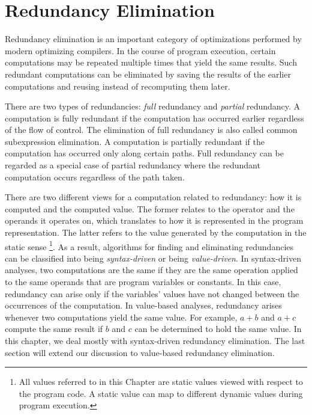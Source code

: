 \chapter{Redundancy Elimination}
\label{chapter:pre_not_helped}

\label{section:Part3:Pre_not_helped:Intro}

Redundancy elimination is an important category of optimizations performed by modern optimizing compilers. 
In the course of program execution, certain computations may be repeated multiple times that yield the same results. 
Such redundant computations can be eliminated by saving the results of the earlier computations and reusing instead of recomputing them later.

There are two types of redundancies: 
\emph{full} redundancy and \emph{partial} redundancy. 
A computation is fully redundant if the computation has occurred earlier regardless of the flow of control. 
The elimination of full redundancy is also called common subexpression elimination. 
A computation is partially redundant if the computation has occurred only along certain paths. 
Full redundancy can be regarded as a special case of partial redundancy where the redundant computation occurs regardless of the path taken.

There are two different views for a computation related to redundancy: 
how it is computed and the computed value. 
The former relates to the operator and the operands it operates on, which translates to how it is represented in the program representation. 
The latter refers to the value generated by the computation in the static sense
\footnote{All values referred to in this Chapter are static values viewed with respect to the program code. 
  A static value can map to different dynamic values during program execution.}. 
As a result, algorithms for finding and eliminating redundancies can be classified into being \emph{syntax-driven} or being \emph{value-driven}. 
In syntax-driven analyses, two computations are the same if they are the same operation applied to the same operands that are program variables or constants. 
In this case, redundancy can arise only if the variables' values have not changed between the occurrences of the computation. 
In value-based analyses, redundancy arises whenever two computations yield the same value. 
For example, $a+b$ and $a+c$ compute the same result if $b$ and $c$ can be determined to hold the same value. 
In this chapter, we deal mostly with syntax-driven redundancy elimination. 
The last section will extend our discussion to value-based redundancy elimination.

